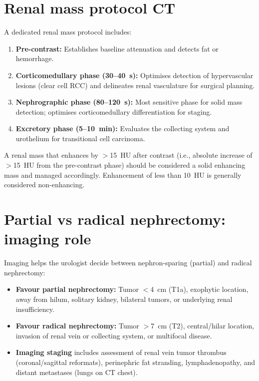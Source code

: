 \section{Renal mass protocol CT}
A dedicated renal mass protocol includes:
\begin{enumerate}
    \item \textbf{Pre-contrast:} Establishes baseline attenuation and detects fat or hemorrhage.
    \item \textbf{Corticomedullary phase (30--40~s):} Optimises detection of hypervascular lesions (clear cell RCC) and delineates renal vasculature for surgical planning.
    \item \textbf{Nephrographic phase (80--120~s):} Most sensitive phase for solid mass detection; optimises corticomedullary differentiation for staging.
    \item \textbf{Excretory phase (5--10~min):} Evaluates the collecting system and urothelium for transitional cell carcinoma.
\end{enumerate}

\begin{pearlbox}[Enhancement = malignancy until proven otherwise]
A renal mass that enhances by $>$15~HU after contrast (i.e., absolute increase of $>$15~HU from the pre-contrast phase) should be considered a solid enhancing mass and managed accordingly. Enhancement of less than 10~HU is generally considered non-enhancing.
\end{pearlbox}

\section{Partial vs radical nephrectomy: imaging role}
Imaging helps the urologist decide between nephron-sparing (partial) and radical nephrectomy:
\begin{itemize}
    \item \textbf{Favour partial nephrectomy:} Tumor $<$4~cm (T1a), exophytic location, away from hilum, solitary kidney, bilateral tumors, or underlying renal insufficiency.
    \item \textbf{Favour radical nephrectomy:} Tumor $>$7~cm (T2), central/hilar location, invasion of renal vein or collecting system, or multifocal disease.
    \item \textbf{Imaging staging} includes assessment of renal vein tumor thrombus (coronal/sagittal reformats), perinephric fat stranding, lymphadenopathy, and distant metastases (lungs on CT chest).
\end{itemize}

